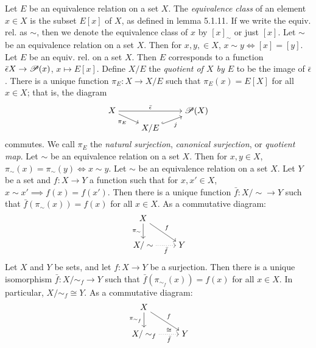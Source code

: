  Let $E$ be an equivalence relation on a set $X$. The \textit{equivalence class} of an element $x \in X$ is the subset $E[x]$ of $X$, as defined in lemma 5.1.11. If we write the equiv. rel. as $\sim$, then we denote the equivalence class of $x$ by $[x]_{\sim}$ or just $[x]$.
 Let $\sim$ be an equivalence relation on a set $X$. Then for $x, y, \in X$, $x \sim y \iff [x] = [y]$.
 Let $E$ be an equiv. rel. on a set $X$. Then $E$ corresponds to a function $\bar{\epsilon} X \to \operatorname{\mathscr{P}}(x)$, $x \mapsto E[x]$. Define $X/E$ the \textit{quotient of $X$ by $E$} to be the image of $\bar{\epsilon}$.
 There is a unique function $\pi_E \colon X \to X/E$ such that $\pi_E(x) = E[X]$ for all $x \in X$; that is, the diagram
\[\begin{tikzcd}[cramped,row sep=tiny]
    X && {\mathscr{P}(X)} \\
    & {X/E}
    \arrow["{\bar{\epsilon}}", from=1-1, to=1-3]
    \arrow["{\pi_E}"', from=1-1, to=2-2]
    \arrow["j"', hook, from=2-2, to=1-3]
\end{tikzcd}\]
commutes. We call $\pi_E$ the \textit{natural surjection}, \textit{canonical surjection}, or \textit{quotient map}.
 Let $\sim$ be an equivalence relation on a set $X$. Then for $x, y \in X$, $\pi_{\sim}(x) = \pi_{\sim}(y) \iff x \sim y$.
 Let $\sim$ be an equivalence relation on a set $X$. Let $Y$ be a set and $f \colon X \to Y$ a function such that for $x, x' \in X$, $x \sim x' \implies f(x) = f(x')$. Then there is a unique function $\bar{f} \colon X/\sim \to Y$ such that $\bar{f}(\pi_{\sim}(x)) = f(x)$ for all $x \in X$. As a commutative diagram:
\[\begin{tikzcd}[cramped]
    X \\
    {X/\sim} & Y
    \arrow["{\pi_{\sim}}"', from=1-1, to=2-1]
    \arrow["f", from=1-1, to=2-2]
    \arrow["{\bar{f}}"', dotted, from=2-1, to=2-2]
\end{tikzcd}\]
 Let $X$ and $Y$ be sets, and let $f \colon X \to Y$ be a surjection. Then there is a unique isomorphism $\bar{f} \colon X/\sim_f \to Y$ such that $\bar{f}(\pi_{\sim_f}(x)) = f(x)$ for all $x \in X$. In particular, $X/\sim_f \cong Y$. As a commutative diagram:
\[\begin{tikzcd}[cramped]
	X \\
	{X/\sim_f} & Y
	\arrow["{\pi_{\sim_f}}"', from=1-1, to=2-1]
	\arrow["f", from=1-1, to=2-2]
	\arrow["{\bar{f}}"', "\cong", dotted, from=2-1, to=2-2]
\end{tikzcd}\]
